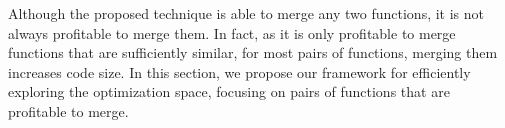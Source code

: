 Although the proposed technique is able to merge any two functions, it is not always profitable to merge them. In fact, as it is only
profitable to merge functions that are sufficiently similar, for most pairs of functions, merging them increases code size.
In this section, we propose our framework for efficiently exploring the
optimization space, focusing on pairs of functions that are profitable to merge. 



